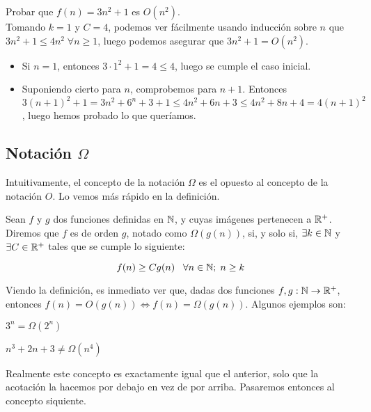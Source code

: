 \begin{ejemplo}
	Probar que $f(n) = 3n^2 + 1$ es $O(n^2)$.\\
	
	Tomando $k=1$ y $C=4$, podemos ver fácilmente usando inducción sobre $n$ que $3n^2 + 1 \leq 4n^2\;\forall n \geq 1$, luego podemos asegurar que $3n^2 + 1 = O(n^2)$.\\
	
	\begin{itemize}
		\item Si $n=1$, entonces $3 \cdot 1^2 + 1 = 4 \leq 4$, luego se cumple el caso inicial.
		\item Suponiendo cierto para $n$, comprobemos para $n + 1$. Entonces $3(n+1)^2 + 1 = 3n^2 + 6^n + 3 + 1 \leq 4n^2 + 6n + 3 \leq 4n^2 + 8n + 4 = 4(n+1)^2$, luego hemos probado lo que queríamos.
	\end{itemize}
\end{ejemplo}

\subsection{Notación $\Omega$}

Intuitivamente, el concepto de la notación $\Omega$ es el opuesto al concepto de la notación $O$. Lo vemos más rápido en la definición.

\begin{definicion}
	Sean $f$ y $g$ dos funciones definidas en $\mathbb{N}$, y cuyas imágenes pertenecen a $\mathbb{R}^+$. Diremos que $f$ es de orden $g$, notado como $\Omega(g(n))$, si, y solo si, $\exists k \in \mathbb{N}$ y $\exists C \in \mathbb{R}^+$ tales que se cumple lo siguiente:
	
	$$f(n) \geq Cg(n) \;\;\;\forall n \in \mathbb{N};\; n \geq k$$
\end{definicion}

Viendo la definición, es inmediato ver que, dadas dos funciones $f,g:\mathbb{N} \to \mathbb{R}^+$, entonces $f(n) = O(g(n)) \Leftrightarrow f(n) = \Omega(g(n))$. Algunos ejemplos son:

\begin{ejemplo}
	$3^n = \Omega(2^n)$
\end{ejemplo}

\begin{ejemplo}
	$n^3 + 2n + 3 \neq \Omega(n^4)$
\end{ejemplo}

Realmente este concepto es exactamente igual que el anterior, solo que la acotación la hacemos por debajo en vez de por arriba. Pasaremos entonces al concepto siquiente.

